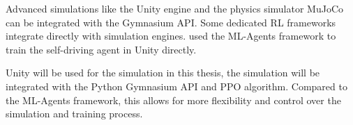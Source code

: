 Advanced simulations like the Unity engine \autocite{unity} and the physics simulator MuJoCo \autocite{mujoco} can be integrated with the Gymnasium API.
Some dedicated \ac{RL} frameworks integrate directly with simulation engines. \textcite{maximilian} used the ML-Agents framework \textcite{mlagents} to train the self-driving agent in Unity directly.

Unity will be used for the simulation in this thesis, the simulation will be integrated with the Python Gymnasium API and \ac{PPO} algorithm. Compared to the ML-Agents framework, this allows for more flexibility and control over the simulation and training process.

